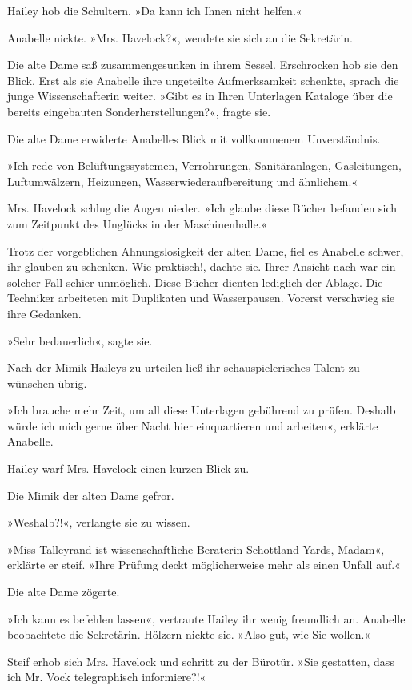 Hailey hob die Schultern. »Da kann ich Ihnen nicht helfen.«

Anabelle nickte. »Mrs. Havelock?«, wendete sie sich an die
Sekretärin.

Die alte Dame saß zusammengesunken in ihrem Sessel. Erschrocken hob
sie den Blick. Erst als sie Anabelle ihre ungeteilte Aufmerksamkeit
schenkte, sprach die junge Wissenschafterin weiter. »Gibt es in
Ihren Unterlagen Kataloge über die bereits eingebauten
Sonderherstellungen?«, fragte sie.

Die alte Dame erwiderte Anabelles Blick mit vollkommenem
Unverständnis.

»Ich rede von Belüftungssystemen, Verrohrungen, Sanitäranlagen,
Gasleitungen, Luftumwälzern, Heizungen, Wasserwiederaufbereitung
und ähnlichem.«

Mrs. Havelock schlug die Augen nieder. »Ich glaube diese Bücher
befanden sich zum Zeitpunkt des Unglücks in der Maschinenhalle.«

Trotz der vorgeblichen Ahnungslosigkeit der alten Dame, fiel es
Anabelle schwer, ihr glauben zu schenken. Wie praktisch!, dachte
sie. Ihrer Ansicht nach war ein solcher Fall schier unmöglich.
Diese Bücher dienten lediglich der Ablage. Die Techniker arbeiteten
mit Duplikaten und Wasserpausen. Vorerst verschwieg sie ihre
Gedanken.

»Sehr bedauerlich«, sagte sie.

Nach der Mimik Haileys zu urteilen ließ ihr schauspielerisches
Talent zu wünschen übrig.

»Ich brauche mehr Zeit, um all diese Unterlagen gebührend zu
prüfen. Deshalb würde ich mich gerne über Nacht hier einquartieren
und arbeiten«, erklärte Anabelle.

Hailey warf Mrs. Havelock einen kurzen Blick zu.

Die Mimik der alten Dame gefror.

»Weshalb?!«, verlangte sie zu wissen.

»Miss Talleyrand ist wissenschaftliche Beraterin Schottland Yards,
Madam«, erklärte er steif. »Ihre Prüfung deckt möglicherweise mehr
als einen Unfall auf.«

Die alte Dame zögerte.

»Ich kann es befehlen lassen«, vertraute Hailey ihr wenig
freundlich an. Anabelle beobachtete die Sekretärin. Hölzern nickte
sie. »Also gut, wie Sie wollen.«

Steif erhob sich Mrs. Havelock und schritt zu der Bürotür. »Sie
gestatten, dass ich Mr. Vock telegraphisch informiere?!«

